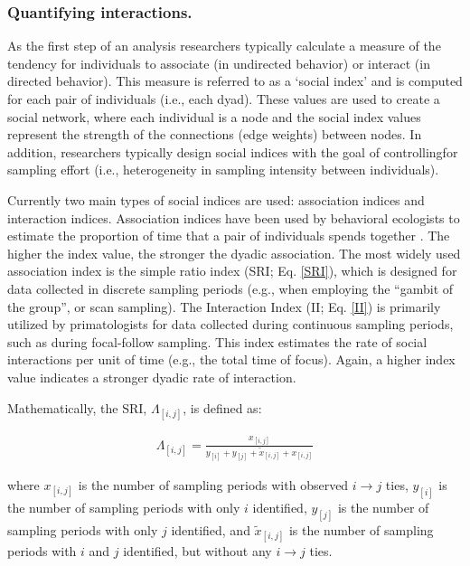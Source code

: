 \documentclass[Afour,sageh,times]{sagej}
\begin{document}
\subsubsection{Quantifying interactions.}
As the first step of an analysis researchers typically calculate a measure of the tendency for individuals to associate (in undirected behavior) or interact (in directed behavior). This measure is referred to as a `social index' and is computed for each pair of individuals (i.e., each dyad). These values are used to create a social network, where each individual is a node and the social index values represent the strength of the connections (edge weights) between nodes. In addition, researchers typically design social indices with the goal of controllingfor sampling effort (i.e., heterogeneity in sampling intensity between individuals). 

 Currently two main types of social indices are used: association indices \citep{hubalek1982coefficients, sailer1984proximity} and interaction indices. Association indices have been used by behavioral ecologists to estimate the proportion of time that a pair of individuals spends together \citep{whitehead2008analyzing}. The higher the index value, the stronger the dyadic association. The most widely used association index is the simple ratio index (SRI; Eq. \ref{SRI}), which is designed for data collected in discrete sampling periods (e.g., when employing the ``gambit of the group'', or scan sampling). The Interaction Index (II; Eq. \ref{II}) is primarily utilized by primatologists for data collected during continuous sampling periods, such as during focal-follow sampling. This index estimates the rate of social interactions per unit of time (e.g., the total time of focus). Again, a higher index value indicates a stronger dyadic rate of interaction. 

Mathematically, the SRI, $\Lambda_{[i,j]}$, is defined as:
\begin{ceqn}
\begin{align}\label{SRI}
	\Lambda_{[i,j]} = \frac{x_{[i,j]}}{y_{[i]}+ y_{[j]}+ \tilde x_{[i,j]}+ x_{[i,j]}}
\end{align}
\end{ceqn}
where $x_{[i,j]}$ is the number of sampling periods with observed $i \to j$ ties, $y_{[i]}$ is the number of sampling periods with only $i$ identified, $y_{[j]}$ is the number of sampling periods with only $j$ identified, and $\tilde x_{[i,j]}$ is the number of sampling periods with $i$ and $j$ identified, but without any $i \to j$ ties.
\end{document}

